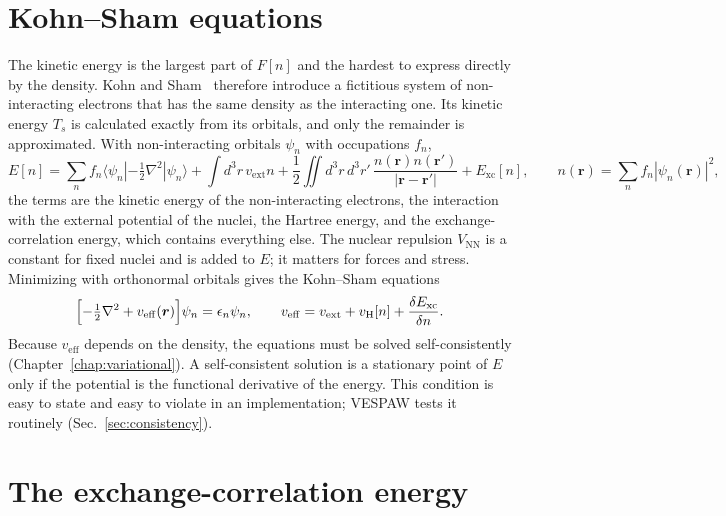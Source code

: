 \documentclass[11pt,a4paper,oneside]{book}
\newcommand{\bra}[1]{\langle #1|}
\newcommand{\ket}[1]{|#1\rangle}
\begin{document}
\section{Kohn--Sham equations}

The kinetic energy is the largest part of $F[n]$ and the hardest to
express directly by the density. Kohn and Sham~\cite{KohnSham1965}
therefore introduce a fictitious system of non-interacting electrons
that has the same density as the interacting one. Its kinetic energy
$T_s$ is calculated exactly from its orbitals, and only the remainder is
approximated. With non-interacting orbitals
$\psi_n$ with occupations $f_n$,
\begin{equation}
  E[n] = \sum_n f_n \bra{\psi_n}-\tfrac12\nabla^2\ket{\psi_n}
  + \int d^3r\, v_{\mathrm{ext}} n
  + \frac12\iint d^3r\,d^3r'\,\frac{n(\bm r)n(\bm r')}{|\bm r-\bm r'|}
  + E_{\mathrm{xc}}[n],
  \qquad n(\bm r)=\sum_n f_n|\psi_n(\bm r)|^2 ,
  \label{eq:eks}
\end{equation}
the terms are the kinetic energy of the non-interacting electrons, the
interaction with the external potential of the nuclei, the Hartree
energy, and the exchange-correlation energy, which contains everything
else. The nuclear repulsion $V_{\mathrm{NN}}$ is a constant for fixed
nuclei and is added to $E$; it matters for forces and stress.
Minimizing with orthonormal orbitals gives the Kohn--Sham equations
\begin{equation}
  \Bigl[-\tfrac12\nabla^2 + v_{\mathrm{eff}}(\bm r)\Bigr]\psi_n = \epsilon_n\psi_n,
  \qquad
  v_{\mathrm{eff}} = v_{\mathrm{ext}} + v_{\mathrm H}[n] + \frac{\delta E_{\mathrm{xc}}}{\delta n}.
\end{equation}
Because $v_{\mathrm{eff}}$ depends on the density, the equations must be
solved self-consistently (Chapter~\ref{chap:variational}). A
self-consistent solution is a stationary point of $E$ only if the
potential is the functional derivative of the energy. This condition is
easy to state and easy to violate in an implementation; VESPAW tests it
routinely (Sec.~\ref{sec:consistency}).

\section{The exchange-correlation energy}
\end{document}
